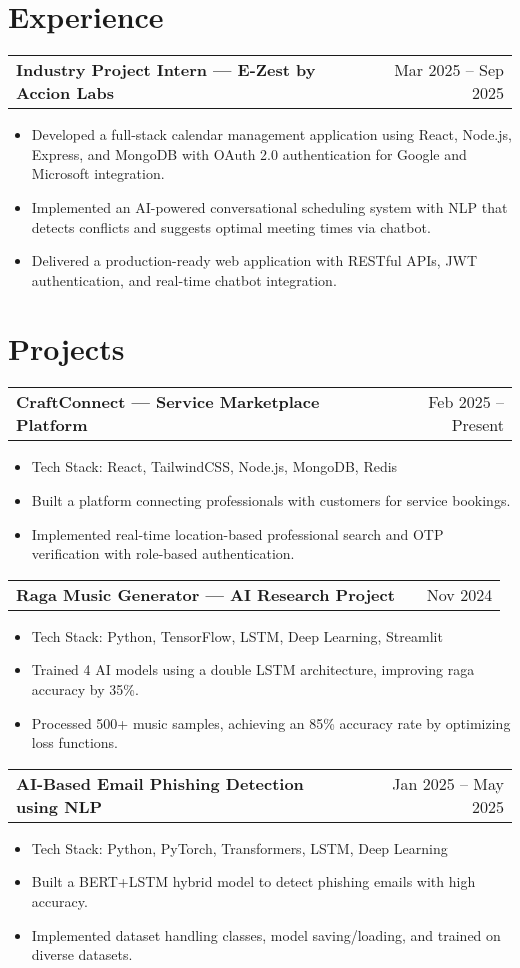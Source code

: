 \documentclass[a4paper,12pt]{article}
\makeatletter
\newenvironment{joblong}[2]
    {
    \begin{tabularx}{\linewidth}{@{}l X r@{}}
    \textbf{#1} & \hfill &  #2 \\[3.75pt]
    \end{tabularx}
    \begin{minipage}[t]{\linewidth}
    \begin{itemize}[nosep,after=\strut, leftmargin=1em, itemsep=3pt,label=\textbullet]
    }
    {
    \end{itemize}
    \end{minipage}    
    }
\makeatother
\begin{document}
\section{Experience}
\begin{joblong}{Industry Project Intern — E-Zest by Accion Labs}{Mar 2025 – Sep 2025}
\item Developed a full-stack calendar management application using React, Node.js, Express, and MongoDB with OAuth 2.0 authentication for Google and Microsoft integration.
\item Implemented an AI-powered conversational scheduling system with NLP that detects conflicts and suggests optimal meeting times via chatbot.
\item Delivered a production-ready web application with RESTful APIs, JWT authentication, and real-time chatbot integration.
\end{joblong}

\section{Projects}

\begin{joblong}{CraftConnect — Service Marketplace Platform}{Feb 2025 – Present}
\item Tech Stack: React, TailwindCSS, Node.js, MongoDB, Redis
\item Built a platform connecting professionals with customers for service bookings.
\item Implemented real-time location-based professional search and OTP verification with role-based authentication.
\end{joblong}

\begin{joblong}{Raga Music Generator — AI Research Project}{Nov 2024}
\item Tech Stack: Python, TensorFlow, LSTM, Deep Learning, Streamlit
\item Trained 4 AI models using a double LSTM architecture, improving raga accuracy by 35\%.
\item Processed 500+ music samples, achieving an 85\% accuracy rate by optimizing loss functions.
\end{joblong}

\begin{joblong}{AI-Based Email Phishing Detection using NLP}{Jan 2025 – May 2025}
\item Tech Stack: Python, PyTorch, Transformers, LSTM, Deep Learning
\item Built a BERT+LSTM hybrid model to detect phishing emails with high accuracy.
\item Implemented dataset handling classes, model saving/loading, and trained on diverse datasets.
\end{joblong}



\vfill
{}
\end{document}
